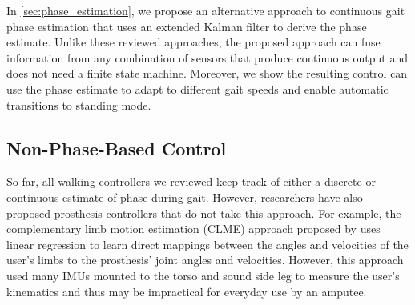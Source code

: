 In \cref{sec:phase_estimation}, we propose an alternative approach to continuous
gait phase estimation that uses an extended Kalman filter to derive the phase
estimate. Unlike these reviewed approaches, the proposed approach can fuse
information from any combination of sensors that produce continuous output and
does not need a finite state machine. Moreover, we show the resulting control
can use the phase estimate to adapt to different gait speeds and enable
automatic transitions to standing mode. 

\subsection{Non-Phase-Based Control}

So far, all walking controllers we reviewed keep track of either a discrete or
continuous estimate of phase during gait. However, researchers have also
proposed prosthesis controllers that do not take this approach. For example, the
complementary limb motion estimation (CLME) approach proposed by
\citet{vallery2011complementary} uses linear regression to learn direct
mappings between the angles and velocities of the user's limbs to the
prosthesis' joint angles and velocities. However, this approach used many IMUs
mounted to the torso and sound side leg to measure the user's kinematics and
thus may be impractical for everyday use by an amputee.

